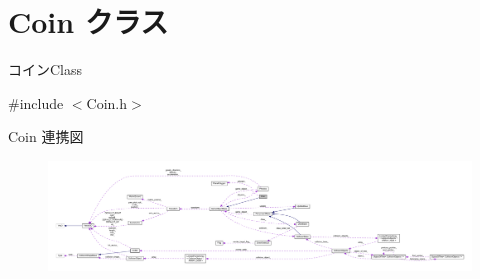 \hypertarget{class_coin}{}\section{Coin クラス}
\label{class_coin}


コイン\+Class  




{\ttfamily \#include $<$Coin.\+h$>$}



Coin 連携図\nopagebreak
\begin{figure}[H]
\begin{center}
\leavevmode
\includegraphics[width=350pt]{class_coin__coll__graph}
\end{center}
\end{figure}

